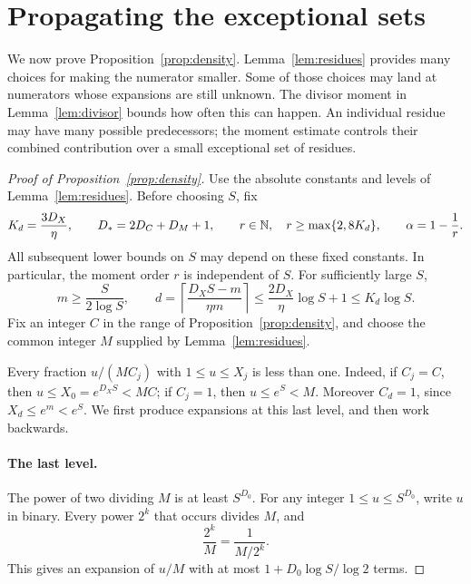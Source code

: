 \section{Propagating the exceptional sets}\label{sec:descent}

We now prove Proposition~\ref{prop:density}.  Lemma~\ref{lem:residues}
provides many choices for making the numerator smaller.  Some of those
choices may land at numerators whose expansions are still unknown.  The
divisor moment in Lemma~\ref{lem:divisor} bounds how often this can happen.
An individual residue may have many possible predecessors; the moment
estimate controls their combined contribution over a small exceptional
set of residues.

\begin{proof}[Proof of Proposition~\ref{prop:density}]
Use the absolute constants and levels of Lemma~\ref{lem:residues}.  Before
choosing \(S\), fix
\[
 K_d=\frac{3D_X}{\eta},\qquad
 D_*=2D_C+D_M+1,
 \qquad r\in\mathbb N,\quad r\ge \max\{2,8K_d\},
 \qquad \alpha=1-\frac1r.
\]
All subsequent lower bounds on \(S\) may depend on these fixed constants.
In particular, the moment order \(r\) is independent of \(S\).
For sufficiently large \(S\),
\begin{equation}\label{eq:descent-depth}
 m\ge\frac{S}{2\log S},
 \qquad
 d=\left\lceil\frac{D_XS-m}{\eta m}\right\rceil
 \le \frac{2D_X}{\eta}\log S+1
 \le K_d\log S.
\end{equation}
Fix an integer \(C\) in the range of Proposition~\ref{prop:density}, and
choose the common integer \(M\) supplied by Lemma~\ref{lem:residues}.

Every fraction \(u/(MC_j)\) with \(1\le u\le X_j\) is less than one.
Indeed, if \(C_j=C\), then \(u\le X_0=e^{D_XS}<MC\); if \(C_j=1\),
then \(u\le e^S<M\).  Moreover \(C_d=1\), since \(X_d\le e^m<e^S\).
We first produce expansions at this last level, and then work backwards.

\paragraph{The last level.}
The power of two dividing \(M\) is at least \(S^{D_0}\).  For any integer
\(1\le u\le S^{D_0}\), write \(u\) in binary.  Every power \(2^k\) that
occurs divides \(M\), and
\[
 \frac{2^k}{M}=\frac1{M/2^k}.
\]
This gives an expansion of \(u/M\) with at most
\(1+D_0\log S/\log 2\) terms.


\end{proof}
